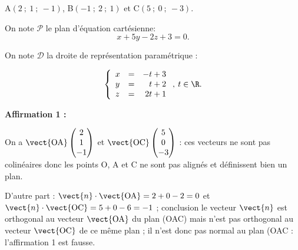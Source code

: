 
\medskip

%
%
%
\begin{center}A$(2~;~1~;~-1)$, \quad B$(-1~;~2~;~1)$ et \quad C$(5~;~0~;~-3)$.\end{center}

On note $\mathcal{P}$ le plan d'équation cartésienne:
\[x + 5y - 2z + 3 = 0.\]

On note $\mathcal{D}$ la droite de représentation paramétrique :

\[\left\{\begin{array}{l c r}
x&=&-t +3\\
y&=&t+ 2\\
z &=& 2t +1
\end{array}\right., \: t \in \R.\]

\medskip

\textbf{Affirmation 1 :}

On a $\vect{\text{OA}}\begin{pmatrix}2\\1\\-1\end{pmatrix}$ et $\vect{\text{OC}}\begin{pmatrix}5\\0\\-3\end{pmatrix}$ : ces vecteurs ne sont pas colinéaires donc les points O, A et C ne sont pas alignés et définissent bien un plan.

D'autre part : $\vect{n} \cdot \vect{\text{OA}} = 2 + 0 - 2 = 0$ et $\vect{n} \cdot \vect{\text{OC}} = 5 + 0 - 6 = - 1$ ; conclusion le vecteur $\vect{n}$ est orthogonal au vecteur $\vect{\text{OA}}$ du plan (OAC) mais n'est pas orthogonal au vecteur $\vect{\text{OC}}$ de ce même plan ; il n'est donc pas normal au plan (OAC : l'affirmation 1 est fausse.
\medskip

